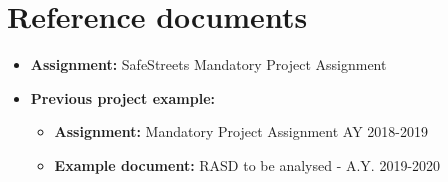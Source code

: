 \section{Reference documents}
\begin{itemize}
  \item \textbf{Assignment:} SafeStreets Mandatory Project Assignment
  \item \textbf{Previous project example:}
  \begin{itemize}
    \item \textbf{Assignment:} Mandatory Project Assignment AY 2018-2019
    \item \textbf{Example document:} RASD to be analysed - A.Y. 2019-2020
  \end{itemize}
\end{itemize}